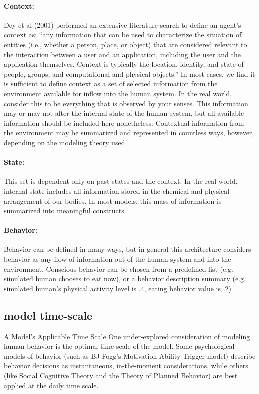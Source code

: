 \documentclass[runningheads,a4paper]{llncs}
\begin{document}
\paragraph{Context:}
Dey et al (2001) performed an extensive literature search to define an agent’s context as: “any information that can be used to characterize the situation of entities (i.e., whether a person, place, or object) that are considered relevant to the interaction between a user and an application, including the user and the application themselves. Context is typically the location, identity, and state of people, groups, and computational and physical objects.” In most cases, we find it is sufficient to define context as a set of selected information from the environment available for inflow into the human system. In the real world, consider this to be everything that is observed by your senses. This information may or may not alter the internal state of the human system, but all available information should be included here nonetheless. Contextual information from the environment may be summarized and represented in countless ways, however, depending on the modeling theory used.

\paragraph{State:}
This set is dependent only on past states and the context. In the real world, internal state includes all information stored in the chemical and physical  arrangement of our bodies. In most models, this mass of information is summarized into meaningful constructs.

\paragraph{Behavior:}
Behavior can be defined in many ways, but in general this architecture considers behavior as any flow of information out of the human system and into the environment. Conscious behavior can be chosen from a predefined list (e.g. simulated human chooses to eat now), or a behavior description summary (e.g. simulated human’s physical activity level is .4, eating behavior value is .2)

\subsection{model time-scale}
A Model’s Applicable Time Scale
One under-explored consideration of modeling human behavior is the optimal time scale of the model. Some psychological models of behavior (such as BJ Fogg’s Motivation-Ability-Trigger model) describe behavior decisions as instantaneous, in-the-moment considerations, while others (like Social Cognitive Theory and the Theory of Planned Behavior) are best applied at the daily time scale.
\end{document}
